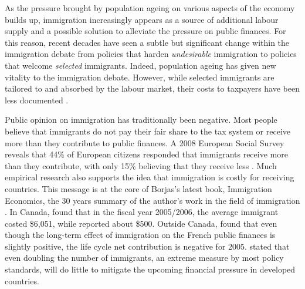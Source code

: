 \vspace{0.7em}\par
As the pressure brought by population ageing on various aspects of the economy builds up, immigration increasingly appears as a source of additional labour supply and a possible solution to alleviate the pressure on public finances.
For this reason, recent decades have seen a subtle but significant change within the immigration debate from policies that harden \textit{undesirable} immigration to policies that welcome \textit{selected} immigrants.
Indeed, population ageing has given new vitality to the immigration debate. However, while selected immigrants are tailored to and absorbed by the labour market, their costs to taxpayers have been less documented \citep{Dustmann:2007fl}.

\vspace{0.7em}\par
Public opinion on immigration has traditionally been negative. Most people believe that immigrants do not pay their fair share to the tax system or receive more than they contribute to public finances.
A 2008 European Social Survey reveals that 44\% of European citizens responded that immigrants receive more than they contribute, with only 15\% believing that they receive less \citep{Dustmann:2014dr}.
Much empirical research also supports the idea that immigration is costly for receiving countries.
This message is at the core of Borjas's latest book, Immigration Economics, the 30 years summary of the author's work in the field of immigration \citep{Card:2016ku}.
In Canada, \citet{Grubel:2012wo} found that in the fiscal year 2005/2006, the average immigrant costed \$6,051, while \citet{Javdani:2013gu} reported about \$500.
Outside Canada, \citet{Chojnicki:2011vu} found that even though the long-term effect of immigration on the French public finances is slightly positive, the life cycle net contribution is negative for 2005.
\citet{Fehr:2003gq} stated that even doubling the number of immigrants, an extreme measure by most policy standards, will do little to mitigate the upcoming financial pressure in developed countries.


